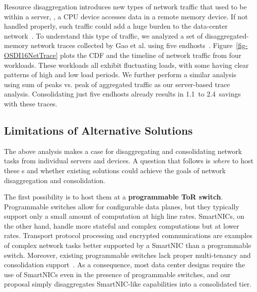 Resource disaggregation introduces new types of network traffic that used to be within a server, \eg, a CPU device accesses data in a remote memory device. 
If not handled properly, such traffic could add a huge burden to the data-center network~\cite{sirius-sigcomm20}.
To understand this type of traffic, we analyzed a set of disaggregated-memory network traces collected by Gao et al. using five endhosts~\cite{Gao16-OSDI}.
Figure~\ref{fig-OSDI16NetTrace} plots the CDF and the timeline of network traffic from four workloads.
These workloads all exhibit fluctuating loads, with some having clear patterns of high and low load periods.
We further perform a similar analysis using sum of peaks vs. peak of aggregated traffic as our server-based trace analysis.
Consolidating just five endhosts already results in 1.1\x\ to 2.4\x\ savings with these traces.





\subsection{Limitations of Alternative Solutions}
\label{sec:related}

The above analysis makes a case for disaggregating and consolidating network tasks from individual servers and devices.
A question that follows is \textit{where} to host these \nt{}s and whether existing solutions could achieve the goals of network disaggregation and consolidation.

%
The first possibility is to host them at a \textbf{programmable ToR switch}. Programmable switches allow for configurable data planes, but they typically support only a small amount of computation at high line rates. SmartNICs, on the other hand, handle more stateful and complex computations but at lower rates. Transport protocol processing and encrypted communications are examples of complex network tasks better supported by a SmartNIC than a programmable switch. Moreover, existing programmable switches lack proper multi-tenancy and consolidation support~\cite{Wang-HotCloud20}. As a consequence, most data center designs require the use of SmartNICs even in the presence of programmable switches, and our proposal simply disaggregates SmartNIC-like capabilities into a consolidated tier.



